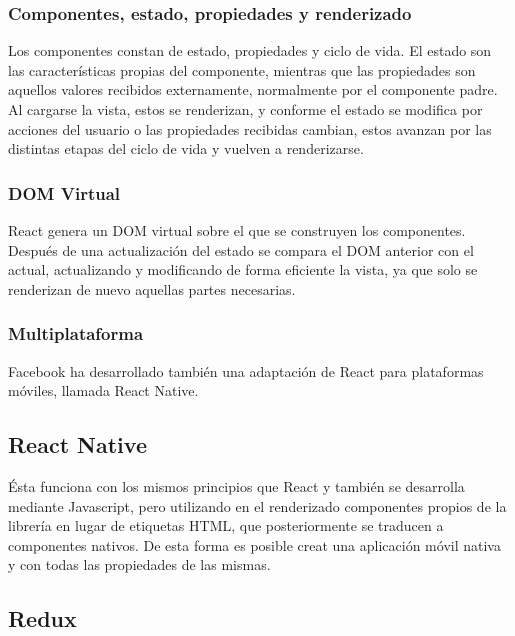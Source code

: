 \subsubsection {Componentes, estado, propiedades y renderizado}

Los componentes constan de estado, propiedades y ciclo de vida. El estado son las características propias del componente, mientras que las propiedades son aquellos valores recibidos externamente, normalmente por el componente padre. Al cargarse la vista, estos se renderizan, y conforme el estado se modifica por acciones del usuario o las propiedades recibidas cambian, estos avanzan por las distintas etapas del ciclo de vida y vuelven a renderizarse. \\

\subsubsection {DOM Virtual}

React genera un DOM virtual sobre el que se construyen los componentes. Después de una actualización del estado se compara el DOM anterior con el actual, actualizando y modificando de forma eficiente la vista, ya que solo se renderizan de nuevo aquellas partes necesarias.  \\

\subsubsection {Multiplataforma}

Facebook ha desarrollado también una adaptación de React para plataformas móviles, llamada React Native.

\subsection {React Native} 

Ésta funciona con los mismos principios que React y también se desarrolla mediante Javascript, pero utilizando en el renderizado componentes propios de la librería en lugar de etiquetas HTML, que posteriormente se traducen a componentes nativos. De esta forma es posible creat una aplicación móvil nativa y con todas las propiedades de las mismas. \\

\subsection {Redux}

